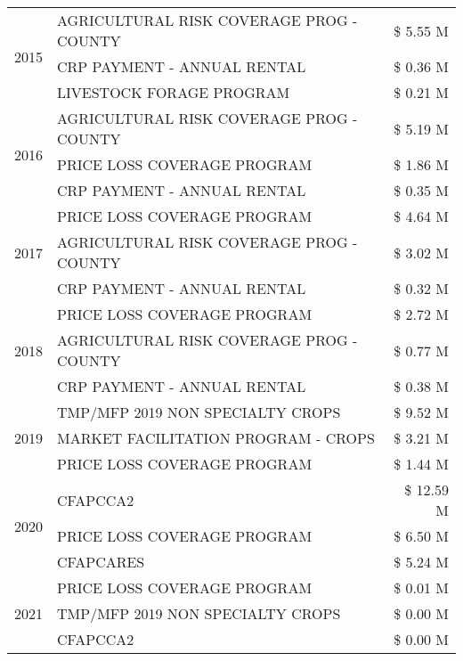 \begin{tabular}{llr}
\cline{1-3}
\multirow[t]{3}{*}{2015} & AGRICULTURAL RISK COVERAGE PROG - COUNTY & \$ 5.55 M \\
 & CRP PAYMENT - ANNUAL RENTAL & \$ 0.36 M \\
 & LIVESTOCK FORAGE PROGRAM & \$ 0.21 M \\
\cline{1-3}
\multirow[t]{3}{*}{2016} & AGRICULTURAL RISK COVERAGE PROG - COUNTY & \$ 5.19 M \\
 & PRICE LOSS COVERAGE PROGRAM & \$ 1.86 M \\
 & CRP PAYMENT - ANNUAL RENTAL & \$ 0.35 M \\
\cline{1-3}
\multirow[t]{3}{*}{2017} & PRICE LOSS COVERAGE PROGRAM & \$ 4.64 M \\
 & AGRICULTURAL RISK COVERAGE PROG - COUNTY & \$ 3.02 M \\
 & CRP PAYMENT - ANNUAL RENTAL & \$ 0.32 M \\
\cline{1-3}
\multirow[t]{3}{*}{2018} & PRICE LOSS COVERAGE PROGRAM & \$ 2.72 M \\
 & AGRICULTURAL RISK COVERAGE PROG - COUNTY & \$ 0.77 M \\
 & CRP PAYMENT - ANNUAL RENTAL & \$ 0.38 M \\
\cline{1-3}
\multirow[t]{3}{*}{2019} & TMP/MFP 2019 NON SPECIALTY CROPS & \$ 9.52 M \\
 & MARKET FACILITATION PROGRAM - CROPS & \$ 3.21 M \\
 & PRICE LOSS COVERAGE PROGRAM & \$ 1.44 M \\
\cline{1-3}
\multirow[t]{3}{*}{2020} & CFAPCCA2 & \$ 12.59 M \\
 & PRICE LOSS COVERAGE PROGRAM & \$ 6.50 M \\
 & CFAPCARES & \$ 5.24 M \\
\cline{1-3}
\multirow[t]{3}{*}{2021} & PRICE LOSS COVERAGE PROGRAM & \$ 0.01 M \\
 & TMP/MFP 2019 NON SPECIALTY CROPS & \$ 0.00 M \\
 & CFAPCCA2 & \$ 0.00 M \\
\cline{1-3}
\bottomrule
\end{tabular}
